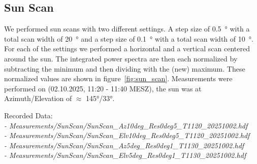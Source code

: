\subsection{Sun Scan}\label{sec:sun_scan}
We performed sun scans with two different settings.
A step size of \SI{0.5}{\degree} with a total scan width of \SI{20}{\degree} and a step size of \SI{0.1}{\degree} with a total scan width of \SI{10}{\degree}.
For each of the settings we performed a horizontal and a vertical scan centered around the sun.
The integrated power spectra are then each normalized by subtracting the minimum and then dividing with the (new) maximum.
These normalized values are shown in figure~\ref{fig:sun_scan}.
Measurements were performed on (02.10.2025, 11:20 - 11:40 MESZ), the sun was at Azimuth/Elevation of $\approx$ 145°/33°.

Recorded Data: \\
\textit{
- Measurements/SunScan/SunScan\_Az10deg\_Res0deg5\_T1120\_20251002.hdf \\
- Measurements/SunScan/SunScan\_Elv10deg\_Res0deg5\_T1120\_20251002.hdf \\
- Measurements/SunScan/SunScan\_Az5deg\_Res0deg1\_T1130\_20251002.hdf \\
- Measurements/SunScan/SunScan\_Elv5deg\_Res0deg1\_T1130\_20251002.hdf \\
} \\
